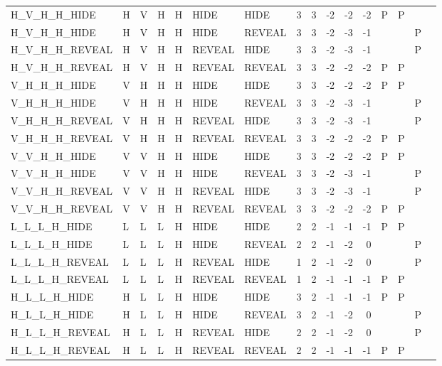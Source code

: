 \begin{longtable}{lllllllrrrrrllll}
  H\_V\_H\_H\_HIDE & H & V & H & H & HIDE & HIDE & 3 & 3 & -2 & -2 & -2 & P & P &  &  \\ 
  H\_V\_H\_H\_HIDE & H & V & H & H & HIDE & REVEAL & 3 & 3 & -2 & -3 & -1 &  &  & P &  \\ 
  H\_V\_H\_H\_REVEAL & H & V & H & H & REVEAL & HIDE & 3 & 3 & -2 & -3 & -1 &  &  & P &  \\ 
  H\_V\_H\_H\_REVEAL & H & V & H & H & REVEAL & REVEAL & 3 & 3 & -2 & -2 & -2 & P & P &  &  \\ 
  V\_H\_H\_H\_HIDE & V & H & H & H & HIDE & HIDE & 3 & 3 & -2 & -2 & -2 & P & P &  &  \\ 
  V\_H\_H\_H\_HIDE & V & H & H & H & HIDE & REVEAL & 3 & 3 & -2 & -3 & -1 &  &  & P &  \\ 
  V\_H\_H\_H\_REVEAL & V & H & H & H & REVEAL & HIDE & 3 & 3 & -2 & -3 & -1 &  &  & P &  \\ 
  V\_H\_H\_H\_REVEAL & V & H & H & H & REVEAL & REVEAL & 3 & 3 & -2 & -2 & -2 & P & P &  &  \\ 
  V\_V\_H\_H\_HIDE & V & V & H & H & HIDE & HIDE & 3 & 3 & -2 & -2 & -2 & P & P &  &  \\ 
  V\_V\_H\_H\_HIDE & V & V & H & H & HIDE & REVEAL & 3 & 3 & -2 & -3 & -1 &  &  & P &  \\ 
  V\_V\_H\_H\_REVEAL & V & V & H & H & REVEAL & HIDE & 3 & 3 & -2 & -3 & -1 &  &  & P &  \\ 
  V\_V\_H\_H\_REVEAL & V & V & H & H & REVEAL & REVEAL & 3 & 3 & -2 & -2 & -2 & P & P &  &  \\ 
  L\_L\_L\_H\_HIDE & L & L & L & H & HIDE & HIDE & 2 & 2 & -1 & -1 & -1 & P & P &  &  \\ 
  L\_L\_L\_H\_HIDE & L & L & L & H & HIDE & REVEAL & 2 & 2 & -1 & -2 & 0 &  &  & P &  \\ 
  L\_L\_L\_H\_REVEAL & L & L & L & H & REVEAL & HIDE & 1 & 2 & -1 & -2 & 0 &  &  & P &  \\ 
  L\_L\_L\_H\_REVEAL & L & L & L & H & REVEAL & REVEAL & 1 & 2 & -1 & -1 & -1 & P & P &  &  \\ 
  H\_L\_L\_H\_HIDE & H & L & L & H & HIDE & HIDE & 3 & 2 & -1 & -1 & -1 & P & P &  &  \\ 
  H\_L\_L\_H\_HIDE & H & L & L & H & HIDE & REVEAL & 3 & 2 & -1 & -2 & 0 &  &  & P &  \\ 
  H\_L\_L\_H\_REVEAL & H & L & L & H & REVEAL & HIDE & 2 & 2 & -1 & -2 & 0 &  &  & P &  \\ 
  H\_L\_L\_H\_REVEAL & H & L & L & H & REVEAL & REVEAL & 2 & 2 & -1 & -1 & -1 & P & P &  &  \\ 

\end{longtable}
